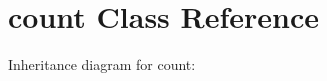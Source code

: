 \hypertarget{classcount}{}\section{count Class Reference}
\label{classcount}


Inheritance diagram for count\+:
